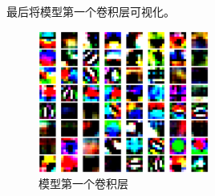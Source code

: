 最后将模型第一个卷积层可视化。

\begin{figure}[H]
    \centering
    \includegraphics[width=0.5\textwidth]{../output/resnet/conv1.png}
    \caption{模型第一个卷积层}
\end{figure}